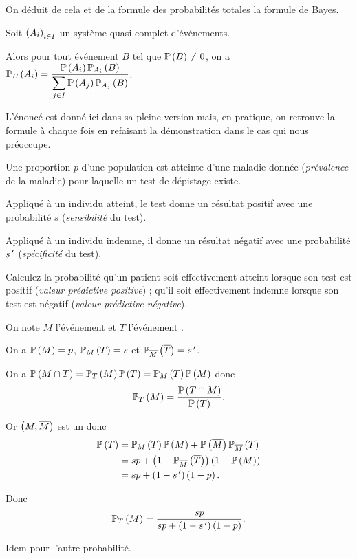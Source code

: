 On déduit de cela et de la formule des probabilités totales la formule de Bayes.

\begin{theo}
Soit \(\paren{A_i}_{i\in I}\) un système quasi-complet d'événements.

Alors pour tout événement \(B\) tel que \(\proba{B}\not=0\), on a \(\probacond{A_i}{B}=\dfrac{\proba{A_i}\probacond{B}{A_i}}{\ds\sum_{j\in I}\proba{A_j}\probacond{B}{A_j}}\).
\end{theo}

\begin{rem}
L'énoncé est donné ici dans sa pleine version mais, en pratique, on retrouve la formule à chaque fois en refaisant la démonstration dans le cas qui nous préoccupe.
\end{rem}

\begin{exo}
Une proportion \(p\) d'une population est atteinte d'une maladie donnée (\textit{prévalence} de la maladie) pour laquelle un test de dépistage existe.

Appliqué à un individu atteint, le test donne un résultat positif avec une probabilité \(s\) (\textit{sensibilité} du test).

Appliqué à un individu indemne, il donne un résultat négatif avec une probabilité \(s\prim\) (\textit{spécificité} du test).

Calculez la probabilité qu'un patient soit effectivement atteint lorsque son test est positif (\textit{valeur prédictive positive}) ; qu'il soit effectivement indemne lorsque son test est négatif (\textit{valeur prédictive négative}).
\end{exo}

\begin{corr}
On note \(M\) l'événement  et \(T\) l'événement .

On a \(\proba{M}=p\), \(\probacond{T}{M}=s\) et \(\probacond{\conj{T}}{\conj{M}}=s\prim\).

On a \(\proba{M\inter T}=\probacond{M}{T}\proba{T}=\probacond{T}{M}\proba{M}\) donc \[\probacond{M}{T}=\dfrac{\proba{T\inter M}}{\proba{T}}.\]

Or \(\paren{M,\conj{M}}\) est un \sce donc \[\begin{aligned}
\proba{T}&=\probacond{T}{M}\proba{M}+\proba{\conj{M}}\probacond{T}{\conj{M}} \\
&=sp+\paren{1-\probacond{\conj{T}}{\conj{M}}}\paren{1-\proba{M}} \\
&=sp+\paren{1-s\prim}\paren{1-p}.
\end{aligned}\]

Donc \[\probacond{M}{T}=\dfrac{sp}{sp+\paren{1-s\prim}\paren{1-p}}.\]

Idem pour l'autre probabilité.
\end{corr}

